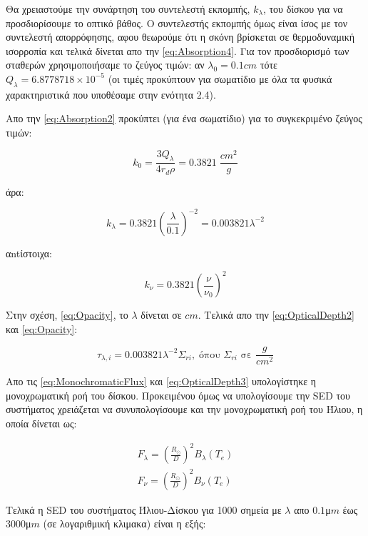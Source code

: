 Θα χρειαστούμε την συνάρτηση του συντελεστή εκπομπής, $k_{\lambda}$, του δίσκου για να προσδιορίσουμε το οπτικό βάθος. Ο συντελεστής εκπομπής όμως είναι ίσος με τον συντελεστή απορρόφησης, αφου θεωρούμε ότι η σκόνη βρίσκεται σε θερμοδυναμική ισορροπία και τελικά δίνεται απο την \eqref{eq:Absorption4}. 
Για τον προσδιορισμό των σταθερών χρησιμοποιήσαμε το ζεύγος τιμών: αν $\lambda_{0}=0.1 cm$ τότε $Q_{\lambda}=6.8778718\times10^{-5}$ (οι τιμές προκύπτουν για σωματίδιο με όλα τα φυσικά χαρακτηριστικά που υποθέσαμε στην ενότητα 2.4). 

Απο την \eqref{eq:Absorption2} προκύπτει (για ένα σωματίδιο) για το συγκεκριμένο ζεύγος τιμών:

\begin{equation}
 k_{0} = \frac{3Q_{\lambda}}{4r_{d} \rho}=0.3821 \; \frac{cm^{2}}{g}
\end{equation}

άρα:

\begin{equation}\label{eq:Opacity}
 k_{\lambda} = 0.3821 (\frac{\lambda}{0.1})^{-2}=0.003821 \lambda^{-2} 
\end{equation}

αntίστοιχα:

\begin{equation}\label{eq:Opacity2}
 k_{\nu} = 0.3821 (\frac{\nu}{\nu_0})^{2} 
\end{equation}

Στην σχέση, \eqref{eq:Opacity}, το $\lambda$ δίνεται σε $cm$. Τελικά απο την \eqref{eq:OpticalDepth2} και \eqref{eq:Opacity}:

\begin{equation}\label{eq:OpticalDepth3}
  \tau_{\lambda,i} = 0.003821 \lambda^{-2} \Sigma_{ri},\; \text{όπου $\Sigma_{ri}$ σε $\frac{g}{cm^{2}}$}
\end{equation}

Απο τις \eqref{eq:MonochromaticFlux} και \eqref{eq:OpticalDepth3} υπολογίστηκε η μονοχρωματική ροή του δίσκου. Προκειμένου όμως να υπολογίσουμε την {\en SED} του συστήματος χρειάζεται να συνυπολογίσουμε και την μονοχρωματική ροή του Ήλιου, η οποία δίνεται ως:

\begin{align}
 F_{\lambda} = (\frac{R_{\odot}}{D})^2 B_{\lambda}(Τ_{e})\\
 F_{\nu} = (\frac{R_{\odot}}{D})^2 B_{\nu}(Τ_{e})
\end{align}\label{eq:SunSED}

Τελικά η {\en SED} του συστήματος Ήλιου-Δίσκου για 1000 σημεία με $\lambda$ απο $0.1$μ$m$ έως $3000$μ$m$ (σε λογαριθμική κλιμακα) είναι η εξής:

